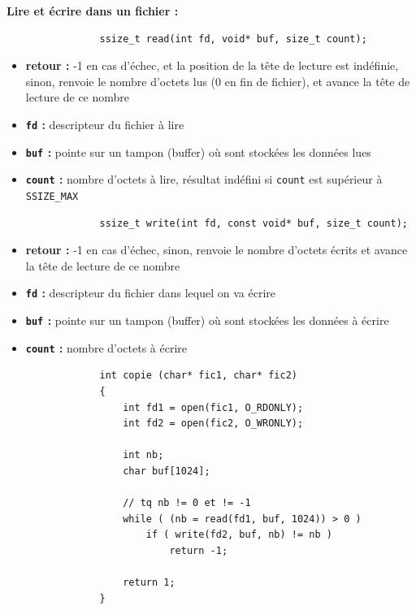 		\begin{frame}[containsverbatim]
			\textbf{Lire et écrire dans un fichier :}\hspace*{-2em}
			\begin{lstlisting}
				ssize_t read(int fd, void* buf, size_t count);
			\end{lstlisting}
			\begin{itemize}
				\item \textbf{retour :} -1 en cas d'échec, et la position de la tête de lecture est indéfinie, sinon, renvoie le nombre d'octets lus (0 en fin de fichier), et avance la tête de lecture de ce nombre
				\item \textbf{\lstinline!fd! :} descripteur du fichier à lire
				\item \textbf{\lstinline!buf! :} pointe sur un tampon (buffer) où sont stockées les données lues 
				\item \textbf{\lstinline!count! :} nombre d'octets à lire, résultat indéfini si \lstinline!count! est supérieur à \lstinline!SSIZE_MAX!
			\end{itemize}
			
			\begin{lstlisting}
				ssize_t write(int fd, const void* buf, size_t count);
			\end{lstlisting}
			\begin{itemize}
				\item \textbf{retour :} -1 en cas d'échec, sinon, renvoie le nombre d'octets écrits et avance la tête de lecture de ce nombre
				\item \textbf{\lstinline!fd! :} descripteur du fichier dans lequel on va écrire
				\item \textbf{\lstinline!buf! :} pointe sur un tampon (buffer) où sont stockées les données à écrire 
				\item \textbf{\lstinline!count! :} nombre d'octets à écrire
			\end{itemize}
		\end{frame}	
		
		\begin{frame}[containsverbatim]
			\begin{lstlisting}
				int copie (char* fic1, char* fic2) 
				{
					int fd1 = open(fic1, O_RDONLY);
					int fd2 = open(fic2, O_WRONLY);
					
					int nb;
					char buf[1024];
					
					// tq nb != 0 et != -1
					while ( (nb = read(fd1, buf, 1024)) > 0 )
						if ( write(fd2, buf, nb) != nb )
							return -1;
							
					return 1;
				}
			\end{lstlisting}
		\end{frame}	
		
